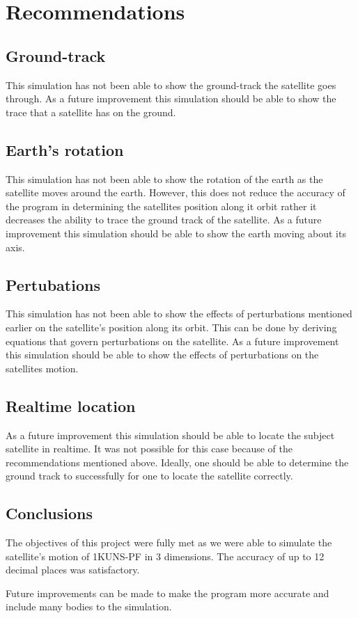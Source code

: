 \section{Recommendations}
\subsection{Ground-track}
This simulation has not been able to show the ground-track the satellite goes through. As a future improvement this simulation should be able to show the trace that a satellite has on the ground.
\subsection{Earth's rotation}
This simulation has not been able to show the rotation of the earth as the satellite moves around the earth. However, this does not reduce the accuracy of the program in determining the satellites position along it orbit rather it decreases the ability to trace the ground track of the satellite. As a future improvement this simulation should be able to show the earth moving about its axis.

\subsection{Pertubations}
This simulation has not been able to show the effects of perturbations mentioned earlier on the satellite's position along its orbit. This can be done by deriving equations that govern perturbations on the satellite. As a future improvement this simulation should be able to show the effects of perturbations on the satellites motion.

\subsection{Realtime location}
As a future improvement this simulation should be able to locate the subject satellite in realtime. It was not possible for this case because of the recommendations mentioned above. Ideally, one should be able to determine the ground track to successfully for one to locate the satellite correctly.

\subsection{Conclusions}
The objectives of this project were fully met as we were able to simulate the satellite's motion of 1KUNS-PF in 3 dimensions. The accuracy of up to 12 decimal places was satisfactory.

Future improvements can be made to make the program more accurate and include many bodies to the simulation.